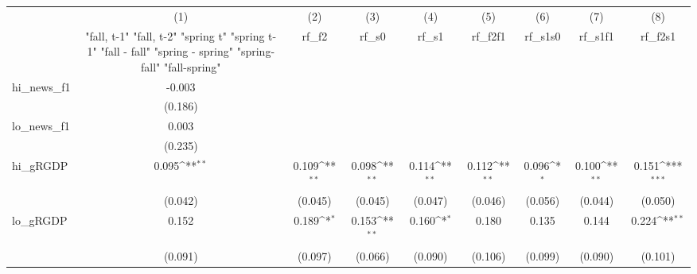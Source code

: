 {
\def\sym#1{\ifmmode^{#1}\else\(^{#1}\)\fi}
\begin{tabular}{l*{8}{c}}
\toprule
            &\multicolumn{1}{c}{(1)}&\multicolumn{1}{c}{(2)}&\multicolumn{1}{c}{(3)}&\multicolumn{1}{c}{(4)}&\multicolumn{1}{c}{(5)}&\multicolumn{1}{c}{(6)}&\multicolumn{1}{c}{(7)}&\multicolumn{1}{c}{(8)}\\
            &\multicolumn{1}{c}{  "fall, t-1" "fall, t-2" "spring t" "spring t-1"  "fall - fall" "spring - spring" "spring-fall" "fall-spring" }&\multicolumn{1}{c}{rf\_f2}&\multicolumn{1}{c}{rf\_s0}&\multicolumn{1}{c}{rf\_s1}&\multicolumn{1}{c}{rf\_f2f1}&\multicolumn{1}{c}{rf\_s1s0}&\multicolumn{1}{c}{rf\_s1f1}&\multicolumn{1}{c}{rf\_f2s1}\\
\midrule
hi\_news\_f1  &      -0.003         &                     &                     &                     &                     &                     &                     &                     \\
            &     (0.186)         &                     &                     &                     &                     &                     &                     &                     \\
\addlinespace
lo\_news\_f1  &       0.003         &                     &                     &                     &                     &                     &                     &                     \\
            &     (0.235)         &                     &                     &                     &                     &                     &                     &                     \\
\addlinespace
hi\_gRGDP    &       0.095\sym{**} &       0.109\sym{**} &       0.098\sym{**} &       0.114\sym{**} &       0.112\sym{**} &       0.096\sym{*}  &       0.100\sym{**} &       0.151\sym{***}\\
            &     (0.042)         &     (0.045)         &     (0.045)         &     (0.047)         &     (0.046)         &     (0.056)         &     (0.044)         &     (0.050)         \\
\addlinespace
lo\_gRGDP    &       0.152         &       0.189\sym{*}  &       0.153\sym{**} &       0.160\sym{*}  &       0.180         &       0.135         &       0.144         &       0.224\sym{**} \\
            &     (0.091)         &     (0.097)         &     (0.066)         &     (0.090)         &     (0.106)         &     (0.099)         &     (0.090)         &     (0.101)         \\

\end{tabular}}
